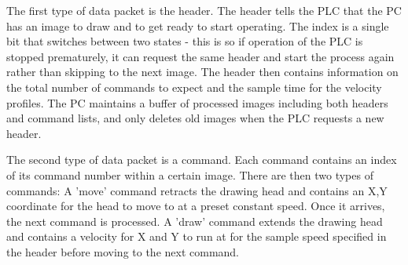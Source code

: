 The first type of data packet is the header. The header tells the PLC that the PC has an image to draw and to get ready to start operating. The index is a single bit that switches between two states - this is so if operation of the PLC is stopped prematurely, it can request the same header and start the process again rather than skipping to the next image. The header then contains information on the total number of commands to expect and the sample time for the velocity profiles. The PC maintains a buffer of processed images including both headers and command lists, and only deletes old images when the PLC requests a new header.

The second type of data packet is a command. Each command contains an index of its command number within a certain image. There are then two types of commands: A 'move' command retracts the drawing head and contains an X,Y coordinate for the head to move to at a preset constant speed. Once it arrives, the next command is processed. A 'draw' command extends the drawing head and contains a velocity for X and Y to run at for the sample speed specified in the header before moving to the next command.

